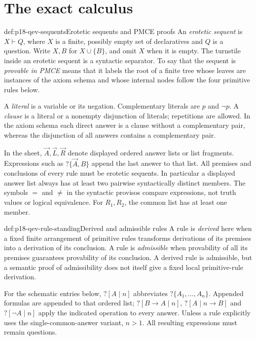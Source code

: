 \section{The exact calculus}

\begin{hbdefinition}{def:p18-qev-sequents}{Erotetic sequents and PMCE proofs}
An \emph{erotetic sequent} is \(X\vdash Q\), where \(X\) is a
finite, possibly empty set of declaratives and \(Q\) is a question.
Write \(X,B\) for \(X\cup\{B\}\), and omit \(X\) when it is
empty. The turnstile inside an erotetic sequent is a syntactic separator.
To say that the sequent is \emph{provable in PMCE} means that it labels
the root of a finite tree whose leaves are instances of the axiom schema
and whose internal nodes follow the four primitive rules below.

A \emph{literal} is a variable or its negation. Complementary literals
are \(p\) and \(\neg p\). A \emph{clause} is a literal or a
nonempty disjunction of literals; repetitions are allowed. In the axiom
schema each direct answer is a clause without a complementary pair,
whereas the disjunction of all answers contains a complementary pair.

In the sheet, \(\vec A,\vec L,\vec R\) denote displayed ordered
answer lists or list fragments. Expressions such as \(?\{\vec A,B\}\) append the
last answer to that list. All premises and conclusions of every rule
must be erotetic sequents. In particular a displayed answer list always
has at least two pairwise syntactically distinct members. The symbols
\(=\) and \(\ne\) in the syntactic provisos compare expressions,
not truth values or logical equivalence. For \(R_1,R_2\), the common
list has at least one member.
\end{hbdefinition}

\begin{hbdefinition}{def:p18-qev-rule-standing}{Derived and admissible rules}
A rule is \emph{derived} here when a fixed finite arrangement of
primitive rules transforms derivations of its premises into a derivation
of its conclusion. A rule is \emph{admissible} when provability of all
its premises guarantees provability of its conclusion. A derived rule
is admissible, but a semantic proof of admissibility does not itself
give a fixed local primitive-rule derivation.

For the schematic entries below, \(?[A\mid n]\) abbreviates
\(?\{A_1,\ldots,A_n\}\). Appended formulas are appended to that
ordered list; \(?[B\to A\mid n]\), \(?[A\mid n\to B]\) and
\(?[\neg A\mid n]\) apply the indicated operation to every answer.
Unless a rule explicitly uses the single-common-answer variant,
\(n>1\). All resulting expressions must remain questions.
\end{hbdefinition}

